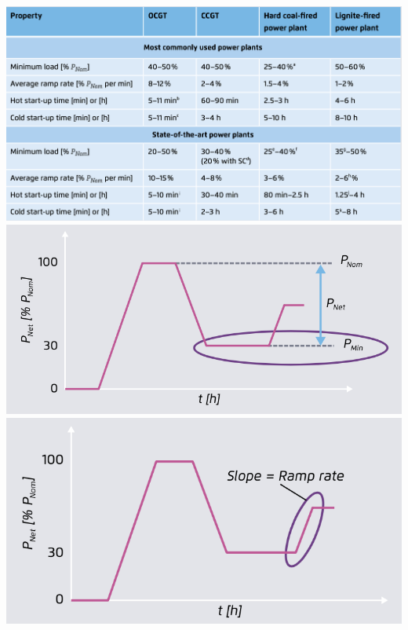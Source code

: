 \documentclass[10pt]{beamer}
\begin{document}
\begin{frame}[label=gas-flex]
\begin{columns}
\includegraphics[width=\textwidth]{fig/flexibility_power_plants.png}
\includegraphics[width=\textwidth]{fig/net_power.png}
\includegraphics[width=\textwidth]{fig/ramp_rate.png}
\end{columns}
\scriptsize{}
\end{frame}
\end{document}
